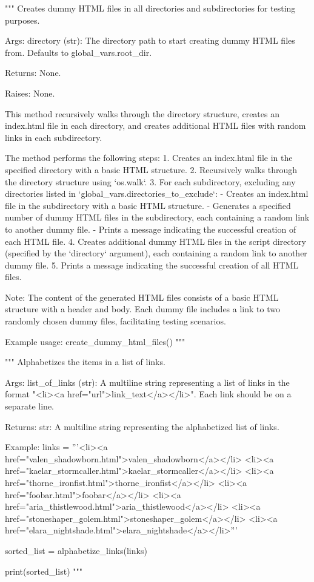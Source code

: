 \begin{codebox}[create\_dummy\_html\_files(directory=global\_vars.root\_dir)]
"""
Creates dummy HTML files in all directories and subdirectories for testing purposes.

Args:
	directory (str): The directory path to start creating dummy HTML files from. Defaults to global_vars.root_dir.

Returns:
	None.

Raises:
	None.

This method recursively walks through the directory structure, creates an index.html file in each directory,
and creates additional HTML files with random links in each subdirectory.

The method performs the following steps:
	1. Creates an index.html file in the specified directory with a basic HTML structure.
	2. Recursively walks through the directory structure using `os.walk`.
	3. For each subdirectory, excluding any directories listed in `global_vars.directories_to_exclude`:
		- Creates an index.html file in the subdirectory with a basic HTML structure.
		- Generates a specified number of dummy HTML files in the subdirectory, each containing a random link to another dummy file.
		- Prints a message indicating the successful creation of each HTML file.
	4. Creates additional dummy HTML files in the script directory (specified by the `directory` argument), each containing a random link to another dummy file.
	5. Prints a message indicating the successful creation of all HTML files.

Note: 
	The content of the generated HTML files consists of a basic HTML structure with a header and body.
Each dummy file includes a link to two randomly chosen dummy files, facilitating testing scenarios.

Example usage:
	create_dummy_html_files()
"""
\end{codebox}


\begin{codebox}
"""
Alphabetizes the items in a list of links.

Args:
	list_of_links (str): A multiline string representing a list of links in the format
	"<li><a href="url">link_text</a></li>". Each link should be on a separate line.

Returns:
	str: A multiline string representing the alphabetized list of links.

Example:
	links = '''<li><a href="valen_shadowborn.html">valen_shadowborn</a></li>
	<li><a href="kaelar_stormcaller.html">kaelar_stormcaller</a></li>
	<li><a href="thorne_ironfist.html">thorne_ironfist</a></li>
	<li><a href="foobar.html">foobar</a></li>
	<li><a href="aria_thistlewood.html">aria_thistlewood</a></li>
	<li><a href="stoneshaper_golem.html">stoneshaper_golem</a></li>
	<li><a href="elara_nightshade.html">elara_nightshade</a></li>'''

	sorted_list = alphabetize_links(links)
	
	print(sorted_list)
"""
\end{codebox}


